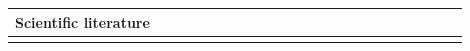 \documentclass[english, 12pt, a4paper, sci, utf8, a-1b, online]{aaltothesis}
\begin{document}
\renewcommand{\arraystretch}{1.5}
\begin{center}
  \begin{longtable}{p{0.3\linewidth}p{0.6\linewidth}}
    \textbf{Scientific literature}                                                                                                                                                                                                                                                                                                                                                                                                                                                                                                                                                                                                                                                                                                                                                                                                                                                                                                      \\
    \hline                                                                                                                                                                                                                                                                                                                                                                                                                                                                                                                                                                                                                                                                                                                                                                                                                                                                                                                              \\

\end{longtable}
\end{center}
\end{document}
